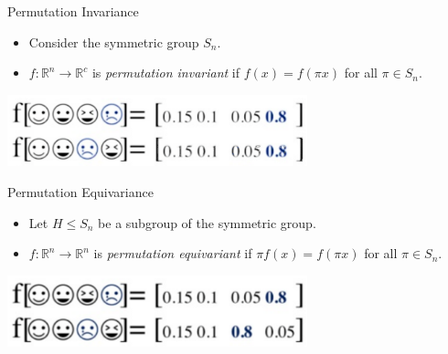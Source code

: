 \documentclass{beamer}
\begin{document}
\begin{frame}{Permutation Invariance}

    \begin{itemize}
        \setlength{\itemsep}{\fill}
        \item Consider the symmetric group $S_n$.
        \pause
        \item $f:\mathbb{R}^n \rightarrow \mathbb{R}^c$ is \textit{permutation invariant} if $f(x) = f(\pi x)$ for all $\pi \in S_n$.
    \end{itemize}
    \begin{center}
        \pause
        \includegraphics[width=0.65\textwidth]{../figures/perm_in.png}
    \end{center}
    
\end{frame}



\begin{frame}{Permutation Equivariance}

    \begin{itemize}
        \setlength{\itemsep}{\fill}
        \item Let $H \leq S_n$ be a subgroup of the symmetric group.
        \pause
        \item $f:\mathbb{R}^n \rightarrow \mathbb{R}^n$ is \textit{permutation equivariant} if $\pi f(x) = f(\pi x)$ for all $\pi \in S_n$.
    \end{itemize}
    \begin{center}
        \pause
        \includegraphics[width=0.65\textwidth]{../figures/perm_eq.png}
    \end{center}
    
\end{frame}
\end{document}
